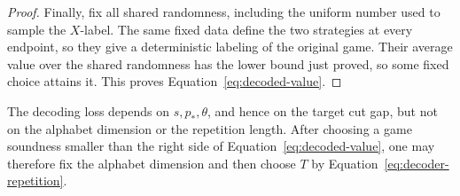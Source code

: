 \begin{proof}
Finally, fix all shared randomness, including the uniform number
used to sample the $X$-label.  The same fixed data define the two
strategies at every endpoint, so they give a deterministic labeling
of the original game.  Their average value over the shared
randomness has the lower bound just proved, so some fixed choice
attains it.  This proves Equation~\eqref{eq:decoded-value}.
\end{proof}

The decoding loss depends on $s,p_*,\theta$, and hence on the target
cut gap, but not on the alphabet dimension or the repetition
length.  After choosing a game soundness smaller than the right
side of Equation~\eqref{eq:decoded-value}, one may therefore fix
the alphabet dimension and then choose $T$ by
Equation~\eqref{eq:decoder-repetition}.
